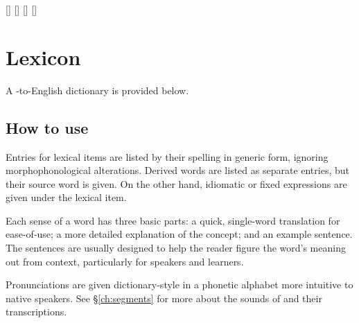 \makeatletter
{}[]{\def\entry@sound{#1}}
[]{\def\entry@pos{#1}}
[]{\def\entry@etym{#1}}
[]{\def\entry@note{#1}}


\newcommand{\entry}[3][]{%
\begingroup%
\setcounter{sense}{1}%
\setkeys{entry}{#1}%
\par \begin{minipage}{\columnwidth}%
	\textbf{\rzc #2}%
	\ifdefempty{\entry@pos}{}{ • {\it\entry@pos}}%
	\ifdefempty{\entry@sound}{}{ • {\entry@sound}}%
	\ifdefempty{\entry@etym}{}{ ← {\entry@etym}}%
	\ifdefempty{\entry@note}{}{ • {\entry@note}}%
	\ • #3%
\end{minipage}%
\endgroup%
}


\makeatother

\setchapterpreamble[u]{\margintoc}
\chapter{Lexicon}
A \langname{}-to-English dictionary is provided below.

\section*{How to use}
Entries for lexical items are listed by their spelling in generic form, ignoring morphophonological alterations. Derived words are listed as separate entries, but their source word is given. On the other hand, idiomatic or fixed expressions are given under the lexical item.

Each sense of a word has three basic parts: a quick, single-word translation for ease-of-use; a more detailed explanation of the concept; and an example sentence. The sentences are usually designed to help the reader figure the word's meaning out from context, particularly for \langname{} speakers and learners.

Pronunciations are given dictionary-style in a phonetic alphabet more intuitive to native \langname{} speakers. See §\ref{ch:segments} for more about the sounds of \langname{} and their transcriptions.

